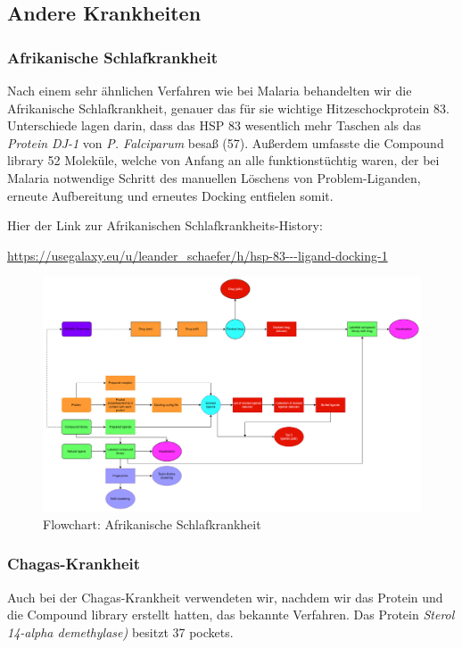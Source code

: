 \documentclass[10pt]{article}
\begin{document}
    \subsection{Andere Krankheiten}\label{subsubsec:andere-krankheiten}

    \subsubsection{Afrikanische Schlafkrankheit}
    Nach einem sehr ähnlichen Verfahren wie bei Malaria behandelten wir die Afrikanische Schlafkrankheit, genauer das
    für sie wichtige Hitzeschockprotein 83. Unterschiede lagen darin, dass das HSP 83 wesentlich mehr Taschen als
    das \emph{Protein DJ-1} von \emph{P. Falciparum} besaß (57). Außerdem umfasste die Compound library 52 Moleküle, welche von Anfang an alle
    funktionstüchtig waren, der bei Malaria notwendige Schritt des manuellen Löschens von Problem-Liganden, erneute
    Aufbereitung und erneutes Docking entfielen somit.

    Hier der Link zur Afrikanischen Schlafkrankheits-History:

    \url{https://usegalaxy.eu/u/leander_schaefer/h/hsp-83---ligand-docking-1}


    \begin{figure}[H]
        \centering
        \includegraphics[width=0.7\linewidth]{afrikanische schlafkrankheit-flowchart}
        \caption{Flowchart: Afrikanische Schlafkrankheit}
    \end{figure}

    \subsubsection{Chagas-Krankheit}
    Auch bei der Chagas-Krankheit verwendeten wir, nachdem wir das Protein und die Compound library erstellt hatten,
    das bekannte Verfahren.
    Das Protein \emph{Sterol 14-alpha demethylase)} besitzt 37 pockets.
\end{document}
